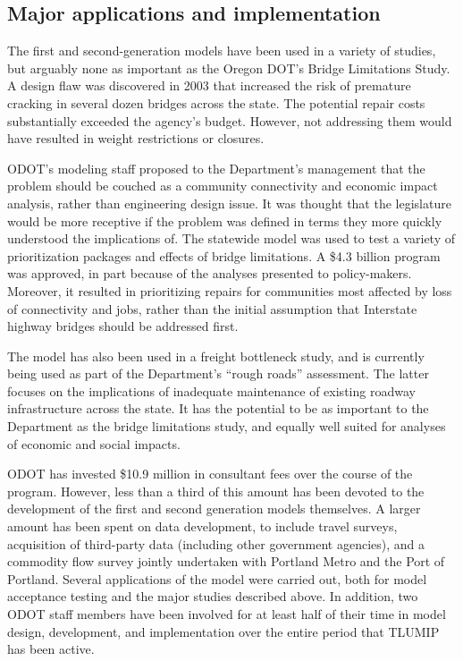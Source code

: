 \subsection{Major applications and implementation}

The first and second-generation models have been used in a variety of studies, but arguably none as important as the Oregon DOT's Bridge Limitations Study. A design flaw was discovered in 2003 that increased the risk of premature cracking in several dozen bridges across the state. The potential repair costs substantially exceeded the agency's budget. However, not addressing them would have resulted in weight restrictions or closures. 

ODOT's modeling staff proposed to the Department's management that the problem should be couched as a community connectivity and economic impact analysis, rather than engineering design issue. It was thought that the legislature would be more receptive if the problem was defined in terms they more quickly understood the implications of. The statewide model was used to test a variety of prioritization packages and effects of bridge limitations. A \$4.3 billion program was approved, in part because of the analyses presented to policy-makers. Moreover, it resulted in prioritizing repairs for communities most affected by loss of connectivity and jobs, rather than the initial assumption that Interstate highway bridges should be addressed first.

The model has also been used in a freight bottleneck study, and is currently being used as part of the Department's ``rough roads'' assessment. The latter focuses on the implications of inadequate maintenance of existing roadway infrastructure across the state. It has the potential to be as important to the Department as the bridge limitations study, and equally well suited for analyses of economic and social impacts.

ODOT has invested \$10.9 million in consultant fees over the course of the program. However, less than a third of this amount has been devoted to the development of the first and second generation models themselves. A larger amount has been spent on data development, to include travel surveys, acquisition of third-party data (including other government agencies), and a commodity flow survey jointly undertaken with Portland Metro and the Port of Portland. Several applications of the model were carried out, both for model acceptance testing and the major studies described above. In addition, two ODOT staff members have been involved for at least half of their time in model design, development, and implementation over the entire period that TLUMIP has been active.

